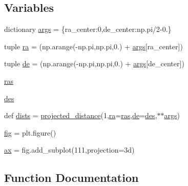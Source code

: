 \subsection*{Variables}
\begin{DoxyCompactItemize}
\item 
dictionary \hyperlink{namespacecoord_a87ee5c40fe361f2c1bfbea4ed5086028}{args} = \{\textquotesingle{}ra\+\_\+center\textquotesingle{}\+:0,\textquotesingle{}de\+\_\+center\textquotesingle{}\+:np.\+pi/2-\/0.\}
\item 
tuple \hyperlink{namespacecoord_a9e8cb473ba5d9c7398020447b51174e0}{ra} = (np.\+arange(-\/np.\+pi,np.\+pi,0.) + \hyperlink{namespacecoord_a87ee5c40fe361f2c1bfbea4ed5086028}{args}\mbox{[}\textquotesingle{}ra\+\_\+center\textquotesingle{}\mbox{]})
\item 
tuple \hyperlink{namespacecoord_a8dcc8c73e25f42279ad5b38825c9b285}{de} = (np.\+arange(-\/np.\+pi,np.\+pi,0.) + \hyperlink{namespacecoord_a87ee5c40fe361f2c1bfbea4ed5086028}{args}\mbox{[}\textquotesingle{}de\+\_\+center\textquotesingle{}\mbox{]})
\item 
\hyperlink{namespacecoord_a5462056be5c33668cdc23bd703b745c5}{ras}
\item 
\hyperlink{namespacecoord_ae502575d54f9026dd1c6b0118fc65c63}{des}
\item 
def \hyperlink{namespacecoord_a2314e07f943e13a24947dced6bee4b64}{dists} = \hyperlink{namespacecoord_a46aebc3089e078f4597812fecdd0975f}{projected\+\_\+distance}(1,\hyperlink{namespacecoord_a9e8cb473ba5d9c7398020447b51174e0}{ra}=\hyperlink{namespacecoord_a5462056be5c33668cdc23bd703b745c5}{ras},\hyperlink{namespacecoord_a8dcc8c73e25f42279ad5b38825c9b285}{de}=\hyperlink{namespacecoord_ae502575d54f9026dd1c6b0118fc65c63}{des},$\ast$$\ast$\hyperlink{namespacecoord_a87ee5c40fe361f2c1bfbea4ed5086028}{args})
\item 
\hyperlink{namespacecoord_abd9b02ef552306f922eb3b6d0be56c34}{fig} = plt.\+figure()
\item 
\hyperlink{namespacecoord_a9aa399b274864850fc9b9569a1256848}{ax} = fig.\+add\+\_\+subplot(111,projection=\textquotesingle{}3d\textquotesingle{})
\end{DoxyCompactItemize}


\subsection{Function Documentation}
\mbox{\label{namespacecoord_af5e3e51606e1533306ebbad1e67d0b17}} 
